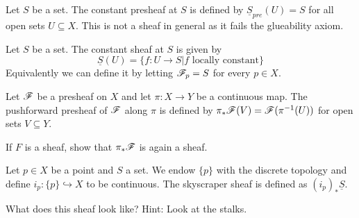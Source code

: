 \begin{example}
Let $S$ be a set. The constant presheaf at $S$ is defined by $\underline{S}_{pre}(U) = S$ for all open sets $U\subseteq X$. This is not a sheaf in general as it fails the glueability axiom. 
\end{example}

\begin{example}
Let $S$ be a set. The constant sheaf at $S$ is given by 
\begin{equation*}
    \underline{S}(U) = \{ f:U\longrightarrow S\vert f \text{ locally constant}\}
\end{equation*}
Equivalently we can define it by letting $\mathscr{F}_p = S$ for every $p\in X$. 
\end{example}

\begin{example}
Let $\mathscr{F}$ be a presheaf on $X$ and let $\pi\colon X\longrightarrow Y$ be a continuous map. The pushforward presheaf of $\mathscr{F}$ along $\pi$ is defined by $\pi_*\mathscr{F}(V)=\mathscr{F}(\pi^{-1}(U))$ for open sets $V\subseteq Y$. 
\end{example}

\begin{problem}
If $F$ is a sheaf, show that $\pi_*\mathscr{F}$ is again a sheaf. 
\end{problem}

\begin{example}
Let $p\in X$ be a point and $S$ a set. We endow $\{p\}$ with the discrete topology and define $i_p\colon \{p\}\hookrightarrow X$ to be continuous. The skyscraper sheaf is defined as $(i_p)_*\underline{S}$. 
\end{example}

\begin{problem}
What does this sheaf look like? Hint: Look at the stalks. 
\end{problem}